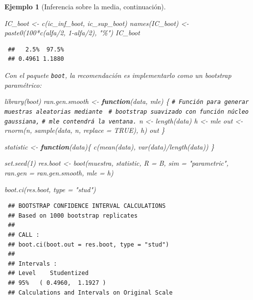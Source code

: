 \documentclass[
  10pt,
]{book}
\newenvironment{Shaded}{\begin{snugshade}}{\end{snugshade}}
\newcommand{\AttributeTok}[1]{\textcolor[rgb]{0.77,0.63,0.00}{#1}}
\newcommand{\CommentTok}[1]{\textcolor[rgb]{0.56,0.35,0.01}{\textit{#1}}}
\newcommand{\ConstantTok}[1]{\textcolor[rgb]{0.00,0.00,0.00}{#1}}
\newcommand{\ControlFlowTok}[1]{\textcolor[rgb]{0.13,0.29,0.53}{\textbf{#1}}}
\newcommand{\DecValTok}[1]{\textcolor[rgb]{0.00,0.00,0.81}{#1}}
\newcommand{\FunctionTok}[1]{\textcolor[rgb]{0.00,0.00,0.00}{#1}}
\newcommand{\NormalTok}[1]{#1}
\newcommand{\OtherTok}[1]{\textcolor[rgb]{0.56,0.35,0.01}{#1}}
\newcommand{\SpecialCharTok}[1]{\textcolor[rgb]{0.00,0.00,0.00}{#1}}
\newcommand{\StringTok}[1]{\textcolor[rgb]{0.31,0.60,0.02}{#1}}
\theoremstyle{break}
\newtheorem{example}{Ejemplo}[chapter]
\theoremstyle{nonumberplain}
\renewcommand{\CommentTok}[1]{\textcolor[rgb]{0.41,0.41,0.41}{\texttt{#1}}}
\begin{document}
\begin{example}[Inferencia sobre la media, continuación]
\begin{Shaded}
\begin{Highlighting}[]
\NormalTok{IC\_boot }\OtherTok{\textless{}{-}} \FunctionTok{c}\NormalTok{(ic\_inf\_boot, ic\_sup\_boot)}
\FunctionTok{names}\NormalTok{(IC\_boot) }\OtherTok{\textless{}{-}} \FunctionTok{paste0}\NormalTok{(}\DecValTok{100}\SpecialCharTok{*}\FunctionTok{c}\NormalTok{(alfa}\SpecialCharTok{/}\DecValTok{2}\NormalTok{, }\DecValTok{1}\SpecialCharTok{{-}}\NormalTok{alfa}\SpecialCharTok{/}\DecValTok{2}\NormalTok{), }\StringTok{"\%"}\NormalTok{)}
\NormalTok{IC\_boot}
\end{Highlighting}
\end{Shaded}

\begin{verbatim}
 ##   2.5%  97.5% 
 ## 0.4961 1.1880
\end{verbatim}

Con el paquete \texttt{boot}, la recomendación es implementarlo como
un bootstrap paramétrico:

\begin{Shaded}
\begin{Highlighting}[]
\FunctionTok{library}\NormalTok{(boot)}
\NormalTok{ran.gen.smooth }\OtherTok{\textless{}{-}} \ControlFlowTok{function}\NormalTok{(data, mle) \{}
    \CommentTok{\# Función para generar muestras aleatorias mediante }
    \CommentTok{\# bootstrap suavizado con función núcleo gaussiana,}
    \CommentTok{\# mle contendrá la ventana.}
\NormalTok{    n }\OtherTok{\textless{}{-}} \FunctionTok{length}\NormalTok{(data)}
\NormalTok{    h }\OtherTok{\textless{}{-}}\NormalTok{ mle}
\NormalTok{    out }\OtherTok{\textless{}{-}} \FunctionTok{rnorm}\NormalTok{(n, }\FunctionTok{sample}\NormalTok{(data, n, }\AttributeTok{replace =} \ConstantTok{TRUE}\NormalTok{), h)}
\NormalTok{    out}
\NormalTok{\}}

\NormalTok{statistic }\OtherTok{\textless{}{-}} \ControlFlowTok{function}\NormalTok{(data)\{}
    \FunctionTok{c}\NormalTok{(}\FunctionTok{mean}\NormalTok{(data), }\FunctionTok{var}\NormalTok{(data)}\SpecialCharTok{/}\FunctionTok{length}\NormalTok{(data))}
\NormalTok{\}}

\FunctionTok{set.seed}\NormalTok{(}\DecValTok{1}\NormalTok{)}
\NormalTok{res.boot }\OtherTok{\textless{}{-}} \FunctionTok{boot}\NormalTok{(muestra, statistic, }\AttributeTok{R =}\NormalTok{ B, }\AttributeTok{sim =} \StringTok{"parametric"}\NormalTok{,}
                 \AttributeTok{ran.gen =}\NormalTok{ ran.gen.smooth, }\AttributeTok{mle =}\NormalTok{ h)}

\FunctionTok{boot.ci}\NormalTok{(res.boot, }\AttributeTok{type =} \StringTok{"stud"}\NormalTok{)}
\end{Highlighting}
\end{Shaded}

\begin{verbatim}
 ## BOOTSTRAP CONFIDENCE INTERVAL CALCULATIONS
 ## Based on 1000 bootstrap replicates
 ## 
 ## CALL : 
 ## boot.ci(boot.out = res.boot, type = "stud")
 ## 
 ## Intervals : 
 ## Level    Studentized     
 ## 95%   ( 0.4960,  1.1927 )  
 ## Calculations and Intervals on Original Scale
\end{verbatim}

\end{example}
\end{document}
